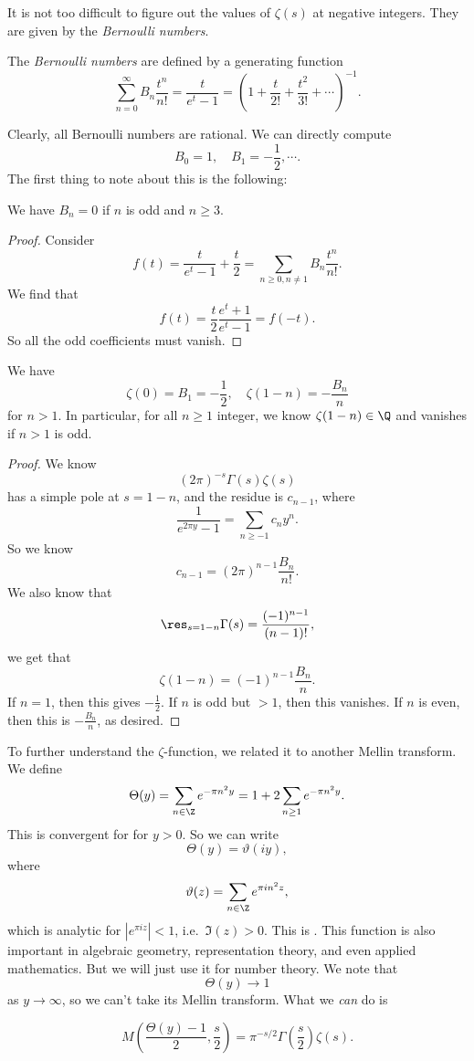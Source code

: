 \documentclass[a4paper]{article}
\begin{document}
It is not too difficult to figure out the values of $\zeta(s)$ at negative integers. They are given by the \emph{Bernoulli numbers}.
\begin{defi}
  The \emph{Bernoulli numbers} are defined by a generating function
  \[
    \sum_{n = 0}^\infty B_n \frac{t^n}{n!} = \frac{t}{e^t - 1} = \left(1 + \frac{t}{2!} + \frac{t^2}{3!} + \cdots\right)^{-1}.
  \]
\end{defi}

Clearly, all Bernoulli numbers are rational. We can directly compute
\[
  B_0 = 1, \quad B_1 = -\frac{1}{2}, \cdots.
\]
The first thing to note about this is the following:
\begin{prop}
  We have $B_n = 0$ if $n$ is odd and $n \geq 3$.
\end{prop}

\begin{proof}
  Consider
  \[
    f(t) = \frac{t}{e^t - 1} + \frac{t}{2} = \sum_{n \geq 0, n \not= 1} B_n \frac{t^n}{n!}.
  \]
  We find that
  \[
    f(t) = \frac{t}{2} \frac{e^t + 1}{e^t - 1} = f(-t).
  \]
  So all the odd coefficients must vanish.
\end{proof}

\begin{cor}
  We have
  \[
    \zeta(0) = B_1 = -\frac{1}{2},\quad \zeta(1 - n)= - \frac{B_n}{n}
  \]
  for $n > 1$. In particular, for all $n \geq 1$ integer, we know $\zeta(1 - n) \in \Q$ and vanishes if $n > 1$ is odd.
\end{cor}

\begin{proof}
  We know
  \[
    (2\pi)^{-s} \Gamma(s) \zeta(s)
  \]
  has a simple pole at $s = 1 - n$, and the residue is $c_{n - 1}$, where
  \[
    \frac{1}{e^{2\pi y} - 1} = \sum_{n \geq -1} c_n y^n.
  \]
  So we know
  \[
    c_{n - 1} = (2\pi)^{n - 1} \frac{B_n}{n!}.
  \]
  We also know that
  \[
    \res_{s = 1 - n} \Gamma(s) = \frac{(-1)^{n - 1}}{(n - 1)!},
  \]
  we get that
  \[
    \zeta(1 - n) = (-1)^{n - 1} \frac{B_n}{n}.
  \]
  If $n = 1$, then this gives $-\frac{1}{2}$. If $n$ is odd but $> 1$, then this vanishes. If $n$ is even, then this is $-\frac{B_n}{n}$, as desired.
\end{proof}

To further understand the $\zeta$-function, we related it to another Mellin transform. We define\index{$\Theta$}
\[
  \Theta(y) = \sum_{n \in \Z} e^{-\pi n^2 y} = 1 + 2 \sum_{n \geq 1} e^{-\pi n^2 y}.
\]
This is convergent for for $y > 0$. So we can write\index{$\vartheta$}
\[
  \Theta(y) = \vartheta(iy),
\]
where
\[
  \vartheta(z) = \sum_{n \in \Z} e^{\pi i n^2 z},
\]
which is analytic for $|e^{\pi i z}| < 1$, i.e.\ $\Im(z) > 0$. This is . This function is also important in algebraic geometry, representation theory, and even applied mathematics. But we will just use it for number theory. We note that
\[
  \Theta(y) \to 1
\]
as $y \to \infty$, so we can't take its Mellin transform. What we \emph{can} do is
\begin{prop}
  \[
    M\left(\frac{\Theta(y) - 1}{2}, \frac{s}{2}\right) = \pi^{-s/2} \Gamma\left(\frac{s}{2}\right) \zeta(s).
  \]
\end{prop}
\end{document}
